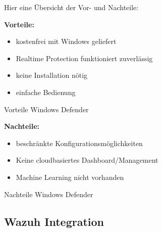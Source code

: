 Hier eine Übersicht der Vor- und Nachteile:\\

\begin{minipage}{\linewidth}
    \begin{multicols}{2}
        \begin{table}[H]
            \begin{center}
                \textbf{Vorteile:}
                \begin{itemize}
                    \item kostenfrei mit Windows geliefert
                    \item Realtime Protection funktioniert zuverlässig
                    \item keine Installation nötig
                    \item einfache Bedienung
                \end{itemize}
            \end{center}
            \caption{Vorteile Windows Defender}
        \end{table}
        \begin{table}[H]
            \begin{center}
                \textbf{Nachteile:}
                \begin{itemize}
                    \item beschränkte Konfigurationsmöglichkeiten
                    \item Keine cloudbasiertes Dashboard/Management
                    \item Machine Learning nicht vorhanden
                \end{itemize}
            \end{center}
            \caption{Nachteile Windows Defender}
        \end{table}
    \end{multicols}
\end{minipage}




\subsection{Wazuh Integration}
